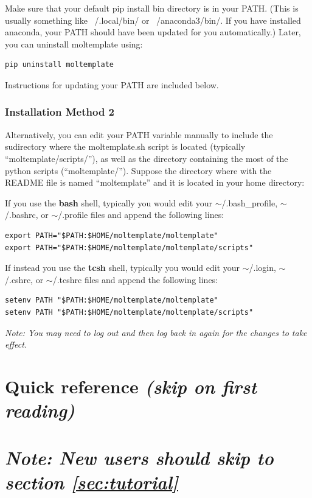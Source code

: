 \documentclass[11pt]{article}
\begin{document}
Make sure that your default pip install bin directory is in your PATH.  (This is usually something like ~/.local/bin/ or ~/anaconda3/bin/.  If you have installed anaconda, your PATH should have been updated for you automatically.)  Later, you can uninstall moltemplate using:
\begin{verbatim}
pip uninstall moltemplate
\end{verbatim}
Instructions for updating your PATH are included below.


\subsubsection*{Installation Method 2}

Alternatively, you can edit your PATH variable manually to include
the sudirectory where the moltemplate.sh script is located 
(typically ``moltemplate/scripts/''), as well as
the directory containing the most of the python scripts (``moltemplate/'').
Suppose the directory where with the README file is named ``moltemplate''
and it is located in your home directory:

If you use the \textbf{bash} shell, typically you would edit your 
\mbox{$\sim$/.bash\_profile}, 
\mbox{$\sim$/.bashrc}, or 
\mbox{$\sim$/.profile} files
and append the following lines:
\begin{verbatim}
export PATH="$PATH:$HOME/moltemplate/moltemplate"
export PATH="$PATH:$HOME/moltemplate/moltemplate/scripts"
\end{verbatim}
If instead you use the \textbf{tcsh} shell, typically you would edit your 
\mbox{$\sim$/.login}, 
\mbox{$\sim$/.cshrc}, or 
\mbox{$\sim$/.tcshrc} files 
and append the following lines:
\begin{verbatim}
setenv PATH "$PATH:$HOME/moltemplate/moltemplate"
setenv PATH "$PATH:$HOME/moltemplate/moltemplate/scripts"
\end{verbatim}



\textit{Note: You may need to log out and then 
log back in again for the changes to take effect.}



\section{Quick reference \textit{(skip on first reading)}}

\section*{
\textit{Note: New users should skip to section \ref{sec:tutorial}}
}
\end{document}
